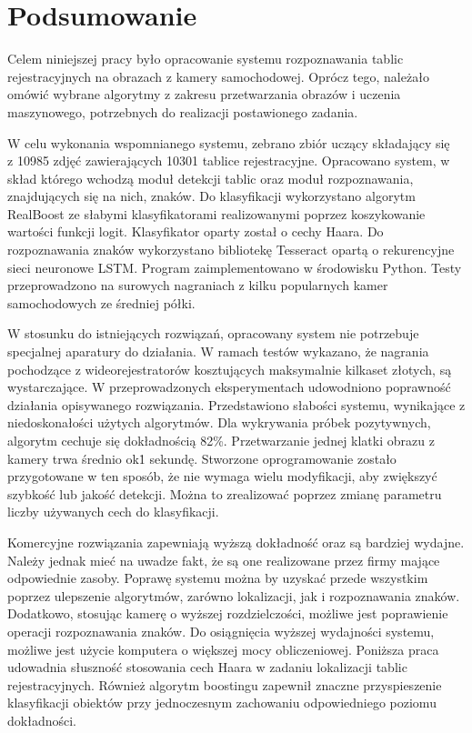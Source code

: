 %


\chapter*{Podsumowanie}
Celem niniejszej pracy było opracowanie systemu rozpoznawania tablic rejestracyjnych na obrazach z kamery samochodowej.
Oprócz tego, należało omówić wybrane algorytmy z zakresu przetwarzania obrazów i uczenia maszynowego, potrzebnych
do realizacji postawionego zadania.

W celu wykonania wspomnianego systemu, zebrano zbiór uczący składający się \\z 10985 zdjęć zawierających 10301 tablice rejestracyjne.
Opracowano system, w skład którego wchodzą moduł detekcji tablic oraz moduł rozpoznawania, znajdujących się na nich, znaków.
Do klasyfikacji wykorzystano algorytm RealBoost ze słabymi klasyfikatorami realizowanymi poprzez koszykowanie wartości funkcji logit.
Klasyfikator oparty został o cechy Haara.
Do rozpoznawania znaków wykorzystano bibliotekę Tesseract opartą o rekurencyjne sieci neuronowe LSTM\@.
Program zaimplementowano w środowisku Python.
Testy przeprowadzono na surowych nagraniach z kilku popularnych kamer samochodowych ze średniej półki.

W stosunku do istniejących rozwiązań, opracowany system nie potrzebuje specjalnej aparatury do działania.
W ramach testów wykazano, że nagrania pochodzące z wideorejestratorów kosztujących maksymalnie kilkaset złotych, są wystarczające.
W przeprowadzonych eksperymentach udowodniono poprawność działania opisywanego rozwiązania.
Przedstawiono słabości systemu, wynikające z niedoskonałości użytych algorytmów.
Dla wykrywania próbek pozytywnych, algorytm cechuje się dokładnością 82\%.
Przetwarzanie jednej klatki obrazu z kamery trwa średnio ok\. 1 sekundę.
Stworzone oprogramowanie zostało przygotowane w ten sposób, że nie wymaga wielu modyfikacji, aby zwiększyć szybkość lub jakość detekcji.
Można to zrealizować poprzez zmianę parametru liczby używanych cech do klasyfikacji.

Komercyjne rozwiązania zapewniają wyższą dokładność oraz są bardziej wydajne.
Należy jednak mieć na uwadze fakt, że są one realizowane przez firmy mające odpowiednie zasoby.
Poprawę systemu można by uzyskać przede wszystkim poprzez ulepszenie algorytmów, zarówno lokalizacji, jak i rozpoznawania znaków.
Dodatkowo, stosując kamerę o wyższej rozdzielczości, możliwe jest poprawienie operacji rozpoznawania znaków.
Do osiągnięcia wyższej wydajności systemu, możliwe jest użycie komputera o większej mocy obliczeniowej.
Poniższa praca udowadnia słuszność stosowania cech Haara w zadaniu lokalizacji tablic rejestracyjnych.
Również algorytm boostingu zapewnił znaczne przyspieszenie klasyfikacji obiektów przy jednoczesnym zachowaniu odpowiedniego poziomu dokładności.

